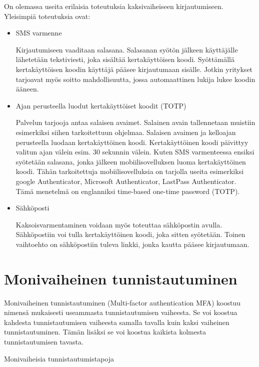 On olemassa useita erilaisia toteutuksia kaksivaiheiseen kirjautumiseen. Yleisimpiä toteutuksia ovat:


\begin{itemize}
    \item SMS varmenne
    
    Kirjautumiseen vaaditaan salasana. Salasanan syötön jälkeen käyttäjälle lähetetään tekstiviesti, joka sisältää kertakäyttöisen koodi. Syöttämällä kertakäyttöisen koodin käyttäjä pääsee kirjautumaan sisälle. Jotkin yritykset tarjoavat myös soitto mahdollisuutta, jossa automaattinen lukija lukee koodin ääneen.
    \item Ajan perusteella luodut kertakäyttöiset koodit (TOTP)
    
    Palvelun tarjooja antaa salaisen avaimet. Salainen avain tallennetaan muistiin esimerkiksi siihen tarkoitettuun ohjelmaa. Salaisen avaimen ja kelloajan perusteella luodaan kertakäyttöinen koodi.  Kertakäyttöinen koodi päivittyy valitun ajan välein esim. 30 sekunnin välein. Kuten SMS varmenteessa ensiksi syötetään salasana, jonka jälkeen mobiilisovelluksen luoma kertakäyttöinen koodi. Tähän tarkoitettuja mobiilisovelluksia on tarjolla useita esimerkiksi google Authenticator, Microsoft Authenticator, LastPass Authenticator. \citep{best_authenticator_apps} Tämä menetelmä on englanniksi time-based one-time password (TOTP).
    
    \item Sähköposti
    
    Kaksoisvarmentaminen voidaan myös toteuttaa sähköpostin avulla. Sähköpostiin voi tulla kertakäyttöinen koodi, joka sitten syötetään. Toinen vaihtoehto on sähköpostiin tuleva linkki, jonka kautta pääsee kirjautumaan. 
\end{itemize}

\section{Monivaiheinen tunnistautuminen}

Monivaiheinen tunnistautuminen (Multi-factor authentication MFA) koostuu nimensä mukaisesti useammasta tunnistautumisen vaiheesta. Se voi koostua kahdesta tunnistautumisen vaiheesta samalla tavalla kuin kaksi vaiheinen tunnistautuminen. Tämän lisäksi se voi koostua kaikista kolmesta tunnistautumisen tavasta.\citep{two_factor_multi_factor_difference}

Monivaiheisia tunnistautumistapoja

